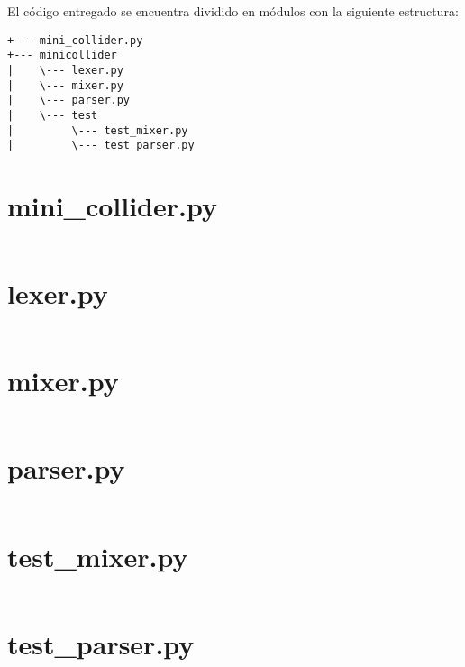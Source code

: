 \documentclass[10pt, a4paper,english,spanish]{article}
\begin{document}

 
\maketitle
\newpage
\thispagestyle{empty}
\mbox{}
\newpage
\parskip 2pt
\parindent 20pt

\setcounter{page}{1}
\tableofcontents



\noindent \newline \newline El código entregado se encuentra dividido en módulos con la siguiente estructura:
\begin{verbatim}
+--- mini_collider.py
+--- minicollider
|    \--- lexer.py
|    \--- mixer.py
|    \--- parser.py
|    \--- test
|         \--- test_mixer.py
|         \--- test_parser.py
\end{verbatim}

\newpage

\newpage
\section{mini\_collider.py}
\inputminted[linenos, tabsize=4]{python}{../mini_collider.py}

\newpage
\section{lexer.py}
\inputminted[linenos, tabsize=4]{python}{../minicollider/lexer.py}

\newpage
\section{mixer.py}
\inputminted[linenos, tabsize=4]{python}{../minicollider/mixer.py}

\newpage
\section{parser.py}
\inputminted[linenos, tabsize=4]{python}{../minicollider/parser.py}

\newpage
\section{test\_mixer.py}
\inputminted[linenos, tabsize=4]{python}{../minicollider/test/test_mixer.py}

\newpage
\section{test\_parser.py}
\inputminted[linenos, tabsize=4]{python}{../minicollider/test/test_parser.py}
\end{document}
